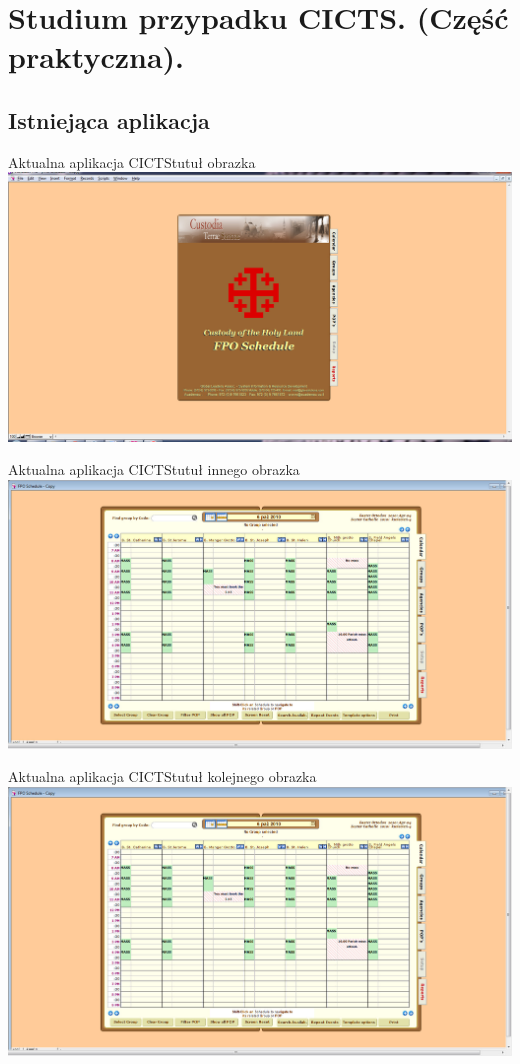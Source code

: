 \section[Studium przypadku CICTS]{Studium przypadku CICTS. (Część praktyczna).}

\subsection{Istniejąca aplikacja}

\begin{frame}{Aktualna aplikacja CICTS}{tutuł obrazka}
   \includegraphics[width=1.0\linewidth]{FPOSchedule1.jpg}
\end{frame}

\begin{frame}{Aktualna aplikacja CICTS}{tutuł innego obrazka}
   \includegraphics[width=1.0\linewidth]{FPOSchedule2.jpg}
\end{frame}

\begin{frame}{Aktualna aplikacja CICTS}{tutuł kolejnego obrazka}
   \includegraphics[width=1.0\linewidth]{FPOSchedule2.jpg}
\end{frame}

